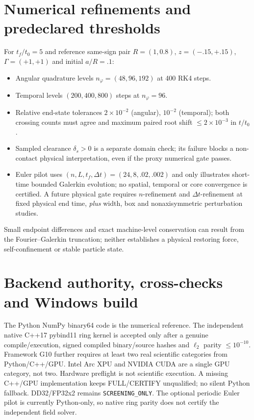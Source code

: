 \documentclass[10pt,a4paper]{article}
\begin{document}
\section{Numerical refinements and predeclared thresholds}
For $t_f/t_0=5$ and reference same-sign pair $R=(1,0.8)$, $z=(-.15,+.15)$, $\Gamma=(+1,+1)$ and initial $a/R=.1$:
\begin{itemize}
\item Angular quadrature levels $n_\varphi=(48,96,192)$ at 400 RK4 steps.
\item Temporal levels $(200,400,800)$ steps at $n_\varphi=96$.
\item Relative end-state tolerances $2\times10^{-2}$ (angular), $10^{-2}$ (temporal); both crossing counts must agree and maximum paired root shift $\leq 2\times10^{-3}$ in $t/t_0$.
\item Sampled clearance $\delta_s>0$ is a separate domain check; its failure blocks a non-contact physical interpretation, even if the proxy numerical gate passes.
\item Euler pilot uses $(n,L,t_f,\Delta t)=(24,8,.02,.002)$ and only illustrates short-time bounded Galerkin evolution; no spatial, temporal or core convergence is certified. A future physical gate requires $n$-refinement and $\Delta t$-refinement at fixed physical end time, \emph{plus} width, box and nonaxisymmetric perturbation studies.
\end{itemize}
Small endpoint differences and exact machine-level conservation can result from the Fourier--Galerkin truncation; neither establishes a physical restoring force, self-confinement or stable particle state.

\section{Backend authority, cross-checks and Windows build}
The Python NumPy binary64 code is the numerical reference. The independent native C++17 pybind11 ring kernel is accepted only after a genuine compile/execution, signed compiled binary/source hashes and $\ell_2$ parity $\leq10^{-10}$. Framework G10 further requires at least two real scientific categories from Python/C++/GPU. Intel Arc XPU and NVIDIA CUDA are a single GPU category, not two. Hardware preflight is not scientific execution. A missing C++/GPU implementation keeps FULL/CERTIFY unqualified; no silent Python fallback. DD32/FP32x2 remains \texttt{SCREENING\_ONLY}. The optional periodic Euler pilot is currently Python-only, so native ring parity does not certify the independent field solver.
\end{document}
